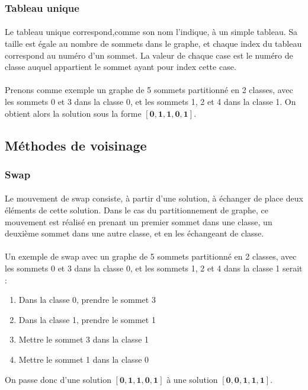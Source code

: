 \documentclass[12pt]{article}
\begin{document}
\subsubsection{Tableau unique}

\paragraph{}Le tableau unique correspond,comme son nom l'indique, à un simple tableau. Sa taille est égale au nombre de sommets dans le graphe, et chaque index du tableau correspond au numéro d'un sommet. La valeur de chaque case est le numéro de classe auquel appartient le sommet ayant pour index cette case.

\paragraph{}Prenons comme exemple un graphe de 5 sommets partitionné en 2 classes, avec les sommets 0 et 3 dans la classe 0, et les sommets 1, 2 et 4 dans la classe 1. On obtient alors la solution sous la forme $\mathbf{[0,1,1,0,1]}$.

\subsection{Méthodes de voisinage}

\subsubsection{Swap}

\paragraph{}Le mouvement de swap consiste, à partir d'une solution, à échanger de place deux éléments de cette solution. Dans le cas du partitionnement de graphe, ce mouvement est réalisé en prenant un premier sommet dans une classe, un deuxième sommet dans une autre classe, et en les échangeant de classe.

\paragraph{}Un exemple de swap avec un graphe de 5 sommets partitionné en 2 classes, avec les sommets 0 et 3 dans la classe 0, et les sommets 1, 2 et 4 dans la classe 1 serait :
\begin{enumerate}
	\item Dans la classe 0, prendre le sommet 3
	\item Dans la classe 1, prendre le sommet 1
	\item Mettre le sommet 3 dans la classe 1
	\item Mettre le sommet 1 dans la classe 0
\end{enumerate}
On passe donc d'une solution $\mathbf{[0,1,1,0,1]}$ à une solution $\mathbf{[0,0,1,1,1]}$.
\end{document}
